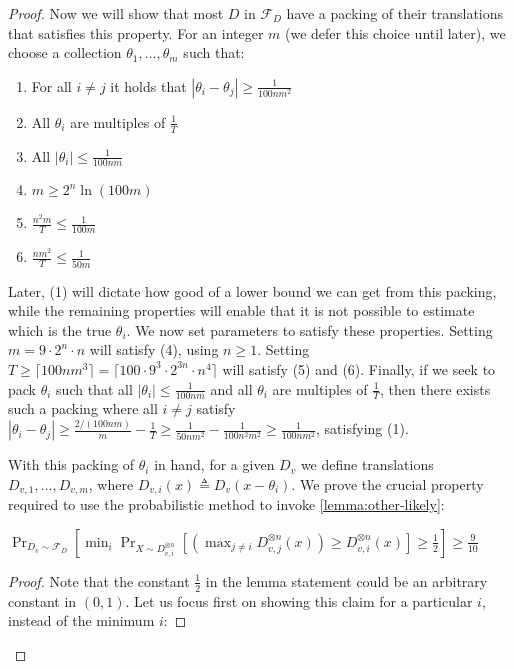 \begin{proof}
Now we will show that most $D$ in $\mathcal{F}_D$ have a packing of their translations that satisfies this property. For an integer $m$ (we defer this choice until later), we choose a collection $\theta_1,\dots,\theta_m$ such that:
\begin{enumerate}
    \item For all $i \ne j$ it holds that $|\theta_i - \theta_j| \ge \frac{1}{100nm^2}$
    \item All $\theta_i$ are multiples of $\frac{1}{T}$
    \item All $|\theta_i| \le \frac{1}{100nm}$
    \item $m \ge 2^n \ln(100m)$ \label{item:a}
    \item $\frac{n^2 m}{T} \le \frac{1}{100m}$ \label{item:b}
    \item $\frac{nm^2}{T} \le \frac{1}{50m}$
\end{enumerate}
Later, (1) will dictate how good of a lower bound we can get from this packing, while the remaining properties will enable that it is not possible to estimate which is the true $\theta_i$. We now set parameters to satisfy these properties. Setting $m = 9 \cdot 2^n \cdot n$ will satisfy (4), using $n \ge 1$. Setting $T \ge \lceil 100nm^3 \rceil = \lceil 100 \cdot 9^3 \cdot 2^{3n} \cdot n^4 \rceil$ will satisfy (5) and (6). Finally, if we seek to pack $\theta_i$ such that all $|\theta_i| \le \frac{1}{100nm}$ and all $\theta_i$ are multiples of $\frac{1}{T}$, then there exists such a packing where all $i\ne j$ satisfy $|\theta_i - \theta_j| \ge \frac{2/(100nm)}{m} - \frac{1}{T} \ge \frac{1}{50nm^2} - \frac{1}{100n^2m^2} \ge \frac{1}{100nm^2}$, satisfying (1).

With this packing of $\theta_i$ in hand, for a given $D_v$ we define translations $D_{v,1},\dots,D_{v,m}$, where $D_{v,i}(x) \triangleq D_v(x - \theta_i)$. We prove the crucial property required to use the probabilistic method to invoke \cref{lemma:other-likely}:

\begin{lemma}\label{lemma:rand-has-overlap}
    $\Pr_{D_v \sim \mathcal{F}_D}\left[\min_i \Pr_{X \sim D_{v,i}^{\otimes n}}\left[(\max_{j \ne i} D_{v,j}^{\otimes n}(x) ) \ge D_{v,i}^{\otimes n}(x)\right] \ge \frac{1}{2}\right] \ge \frac{9}{10}$
\end{lemma}
\begin{proof}
    Note that the constant $\frac{1}{2}$ in the lemma statement could be an arbitrary constant in $(0,1)$. Let us focus first on showing this claim for a particular $i$, instead of the minimum $i$:


\end{proof}
\end{proof}
